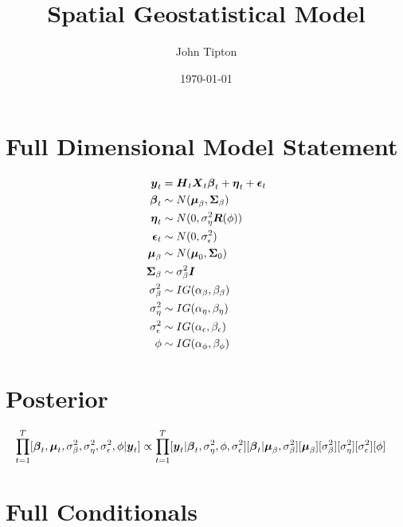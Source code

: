 \documentclass[fleqn]{article}
\title{Spatial Geostatistical Model}
\author{John Tipton}
\date{\today}
\def\bm#1{\mbox{\boldmath $#1$}}
\begin{document}
\maketitle

\section{Full Dimensional Model Statement}
%
\begin{align*}
\bm{y}_t & = \bm{H}_t \bm{X}_t \bm{\beta}_t + \bm{\eta}_t + \bm{\epsilon}_t\\
%
\bm{\beta}_t & \sim N(\bm{\mu}_\beta, \bm{\Sigma}_\beta)\\
%
\bm{\eta}_t & \sim N(0, \sigma^2_\eta \bm{R}(\phi))\\
%
\bm{\epsilon}_t & \sim N(0, \sigma^2_\epsilon)\\
%
\bm{\mu}_\beta & \sim N(\bm{\mu}_0, \bm{\Sigma}_0)\\
%
\bm{\Sigma}_\beta & \sim \sigma_\beta^2 \bm{I}\\
%
\sigma^2_\beta & \sim IG(\alpha_\beta, \beta_\beta)\\
%
\sigma^2_\eta & \sim IG(\alpha_\eta, \beta_\eta)\\
%
\sigma^2_\epsilon & \sim IG(\alpha_\epsilon, \beta_\epsilon)\\
%
\phi & \sim IG(\alpha_\phi, \beta_\phi)
\end{align*}
%
%
\section{Posterior}
%
\begin{align*}
\prod_{t = 1}^T [\bm{\beta}_t, \bm{\mu}_t, \sigma^2_\beta, \sigma^2_\eta, \sigma^2_\epsilon, \phi | \bm{y}_t] & \propto \prod_{t = 1}^T [\bm{y}_t | \bm{\beta}_t, \sigma^2_\eta, \phi, \sigma^2_\epsilon] [\bm{\beta}_t | \bm{\mu}_\beta, \sigma^2_\beta] [\bm{\mu}_\beta] [\sigma^2_\beta] [\sigma^2_\eta] [\sigma^2_\epsilon] [\phi]
\end{align*}
%
\section{Full Conditionals}
%
\end{document}
